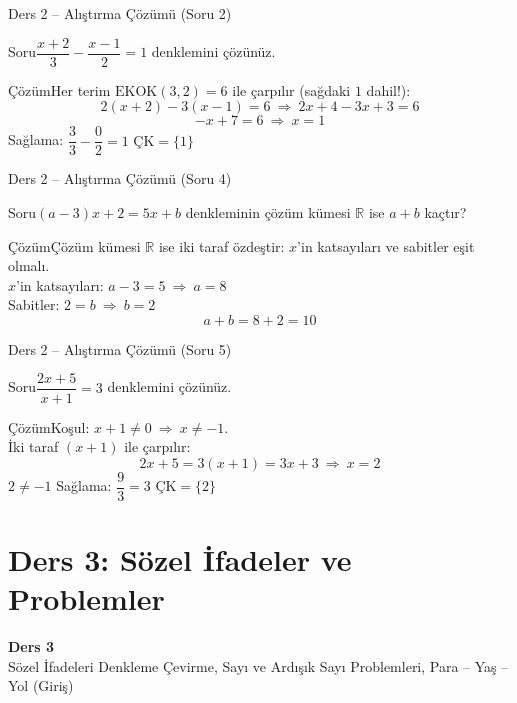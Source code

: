 \documentclass[aspectratio=169,11pt,handout]{beamer}
\newcommand{\soru}[3]{%
\begin{frame}{#1}
  \begin{block}{Soru}\large #2\end{block}
  \pause
  \begin{exampleblock}{Çözüm}\large #3\end{exampleblock}
\end{frame}}
\begin{document}
\soru{Ders 2 -- Alıştırma Çözümü (Soru 2)}
{\(\dfrac{x+2}{3}-\dfrac{x-1}{2}=1\) denklemini çözünüz.}
{Her terim \(\text{EKOK}(3,2)=6\) ile çarpılır (sağdaki \(1\) dahil!):
\[2(x+2)-3(x-1)=6\ \Rightarrow\ 2x+4-3x+3=6\]
\[-x+7=6\ \Rightarrow\ x=1\]
Sağlama: \(\dfrac{3}{3}-\dfrac{0}{2}=1\) \checkmark \qquad \(\text{ÇK}=\{1\}\)}

\soru{Ders 2 -- Alıştırma Çözümü (Soru 4)}
{\((a-3)x+2=5x+b\) denkleminin çözüm kümesi \(\mathbb{R}\) ise \(a+b\) kaçtır?}
{Çözüm kümesi \(\mathbb{R}\) ise iki taraf özdeştir: \(x\)'in katsayıları ve sabitler eşit olmalı.\\[3pt]
\(x\)'in katsayıları: \(a-3=5\ \Rightarrow\ a=8\)\\[3pt]
Sabitler: \(2=b\ \Rightarrow\ b=2\)
\[a+b=8+2=10\]}

\soru{Ders 2 -- Alıştırma Çözümü (Soru 5)}
{\(\dfrac{2x+5}{x+1}=3\) denklemini çözünüz.}
{Koşul: \(x+1\neq 0\ \Rightarrow\ x\neq -1\).\\[3pt]
İki taraf \((x+1)\) ile çarpılır:
\[2x+5=3(x+1)=3x+3\ \Rightarrow\ x=2\]
\(2\neq-1\) \checkmark \quad Sağlama: \(\dfrac{9}{3}=3\) \checkmark \qquad \(\text{ÇK}=\{2\}\)}

\section{Ders 3: Sözel İfadeler ve Problemler}
\begin{frame}
\centering\Large\color{anamavi}\textbf{Ders 3}\\[6pt]\normalsize Sözel İfadeleri Denkleme Çevirme, Sayı ve Ardışık Sayı Problemleri, Para -- Yaş -- Yol (Giriş)
\end{frame}
\end{document}
